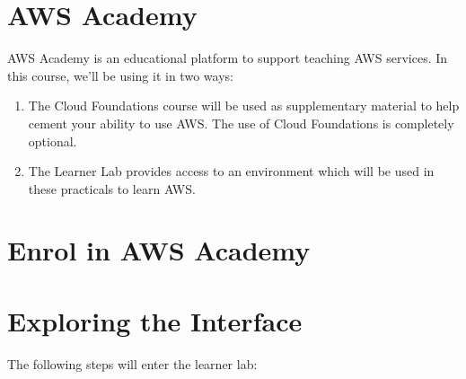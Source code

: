 \documentclass{csse4400}
\begin{document}
\section{AWS Academy}
AWS Academy is an educational platform to support teaching AWS services.
In this course, we'll be using it in two ways:
\begin{enumerate}
    \item The Cloud Foundations course will be used as supplementary material to help cement your ability to use AWS.
          The use of Cloud Foundations is completely optional.
    \item The Learner Lab provides access to an environment which will be used in these practicals to learn AWS. 
\end{enumerate}

\section{Enrol in AWS Academy}


\section{Exploring the Interface}

The following steps will enter the learner lab:
\end{document}
